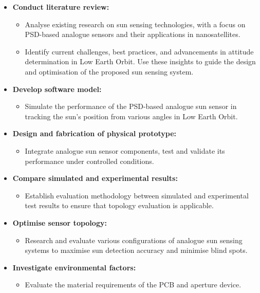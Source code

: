 \begin{itemize}
\item \textbf{Conduct literature review:}
\begin{itemize}
\item Analyse existing research on sun sensing technologies, with a focus on PSD-based analogue sensors and their applications in nanosatellites.
\item Identify current challenges, best practices, and advancements in attitude determination in Low Earth Orbit. Use these insights to guide the design and optimisation of the proposed sun sensing system.
\end{itemize}
\item \textbf{Develop software model:}
\begin{itemize}
    \item Simulate the performance of the PSD-based analogue sun sensor in tracking the sun's position from various angles in Low Earth Orbit.
\end{itemize}

\item \textbf{Design and fabrication of physical prototype:}
\begin{itemize}
    \item Integrate analogue sun sensor components, test and validate its performance under controlled conditions.
\end{itemize}

\item \textbf{Compare simulated and experimental results:}
\begin{itemize}
    \item Establish evaluation methodology between simulated and experimental test results to ensure that topology evaluation is applicable.
\end{itemize}

\item \textbf{Optimise sensor topology:}
\begin{itemize}
    \item Research and evaluate various configurations of analogue sun sensing systems to maximise sun detection accuracy and minimise blind spots.
\end{itemize}

\item \textbf{Investigate environmental factors:}
\begin{itemize}
    
    \item Evaluate the material requirements of the PCB and aperture device.
\end{itemize}


\end{itemize}
